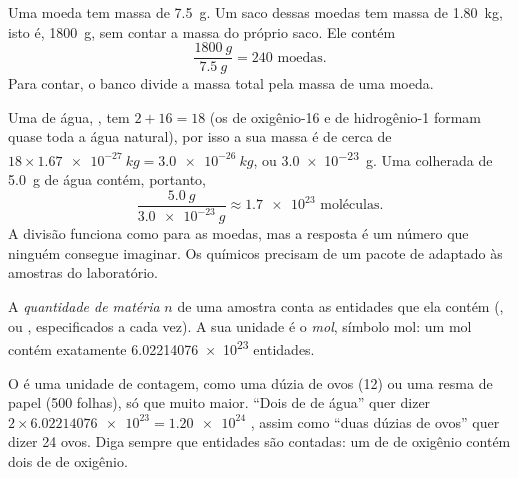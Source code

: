\begin{example}\label{ex:g10:the-mole:coins}
Uma moeda tem massa de \qty{7.5}{g}. Um saco dessas moedas tem massa de
\qty{1.80}{kg}, isto é, \qty{1800}{g}, sem contar a massa do próprio
saco. Ele contém
\[
  \frac{\qty{1800}{g}}{\qty{7.5}{g}} = 240 \text{ moedas.}
\]
Para contar, o banco divide a massa total pela massa de uma moeda.
\end{example}

\begin{example}\label{ex:g10:the-mole:spoon}
Uma  de água, , tem $2 + 16 = 18$  (os  de
oxigênio-16 e de hidrogênio-1 formam quase toda a água natural), por isso
a sua massa é de cerca de
$18 \times \qty{1.67e-27}{kg} = \qty{3.0e-26}{kg}$, ou
\qty{3.0e-23}{g}. Uma colherada de \qty{5.0}{g} de água contém, portanto,
\[
  \frac{\qty{5.0}{g}}{\qty{3.0e-23}{g}} \approx \num{1.7e23}
  \text{ moléculas.}
\]
A divisão funciona como para as moedas, mas a resposta é um número que
ninguém consegue imaginar. Os químicos precisam de um pacote de 
adaptado às amostras do laboratório.
\end{example}

\begin{definition}\label{def:g10:the-mole:amount}
A \emph{quantidade de matéria} $n$ de uma
amostra conta as entidades que ela contém (,  ou ,
especificados a cada vez). A sua unidade é o \emph{mol},
símbolo \si{mol}: um mol contém exatamente \num{6.02214076e23}
entidades.
\end{definition}

\begin{remark}\label{rem:g10:the-mole:dozen}
O  é uma unidade de contagem, como uma dúzia de ovos (12) ou uma resma
de papel (500 folhas), só que muito maior. ``Dois  de  de
água'' quer dizer $2 \times \num{6.02214076e23} = \num{1.20e24}$
, assim como ``duas dúzias de ovos'' quer dizer 24 ovos. Diga
sempre que entidades são contadas: um  de \emph{} de
oxigênio  contém dois  de \emph{} de oxigênio.
\end{remark}

